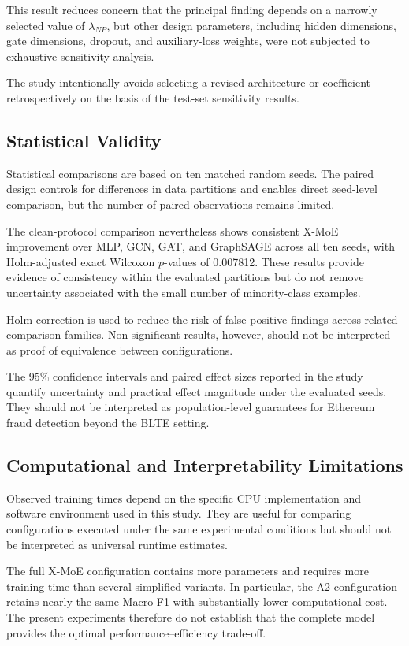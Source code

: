 \documentclass{ieeeaccess}
\begin{document}
This result reduces concern that the principal finding depends on a narrowly selected value of \(\lambda_{NP}\), but other design parameters, including hidden dimensions, gate dimensions, dropout, and auxiliary-loss weights, were not subjected to exhaustive sensitivity analysis.

The study intentionally avoids selecting a revised architecture or coefficient retrospectively on the basis of the test-set sensitivity results.


\subsection{Statistical Validity}

Statistical comparisons are based on ten matched random seeds. The paired design controls for differences in data partitions and enables direct seed-level comparison, but the number of paired observations remains limited.

The clean-protocol comparison nevertheless shows consistent X-MoE improvement over MLP, GCN, GAT, and GraphSAGE across all ten seeds, with Holm-adjusted exact Wilcoxon \(p\)-values of 0.007812. These results provide evidence of consistency within the evaluated partitions but do not remove uncertainty associated with the small number of minority-class examples.

Holm correction is used to reduce the risk of false-positive findings across related comparison families. Non-significant results, however, should not be interpreted as proof of equivalence between configurations.

The 95\% confidence intervals and paired effect sizes reported in the study quantify uncertainty and practical effect magnitude under the evaluated seeds. They should not be interpreted as population-level guarantees for Ethereum fraud detection beyond the BLTE setting.


\subsection{Computational and Interpretability Limitations}

Observed training times depend on the specific CPU implementation and software environment used in this study. They are useful for comparing configurations executed under the same experimental conditions but should not be interpreted as universal runtime estimates.

The full X-MoE configuration contains more parameters and requires more training time than several simplified variants. In particular, the A2 configuration retains nearly the same Macro-F1 with substantially lower computational cost. The present experiments therefore do not establish that the complete model provides the optimal performance--efficiency trade-off.
\end{document}
